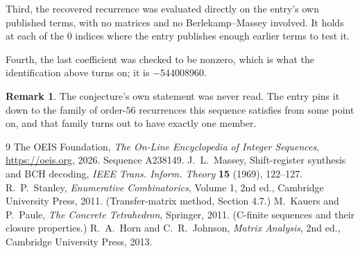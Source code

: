 \documentclass[11pt,a4paper]{article}
\theoremstyle{plain}
\theoremstyle{definition}
\newtheorem{remark}[theorem]{Remark}
\begin{document}
Third, the recovered recurrence was evaluated directly on the entry's own published terms, with
no matrices and no Berlekamp--Massey involved. It holds at each of the $0$ indices where
the entry publishes enough earlier terms to test it.

Fourth, the last coefficient was checked to be nonzero, which is what the identification above
turns on; it is $-544008960$.

\begin{remark}
The conjecture's own statement was never read. The entry pins it down to the family of
order-$56$ recurrences this sequence satisfies from some point on, and that family turns
out to have exactly one member.
\end{remark}

\begin{thebibliography}{9}
 The OEIS Foundation, \emph{The On-Line Encyclopedia of Integer
Sequences}, \url{https://oeis.org}, 2026. Sequence A238149.
 J.~L.~Massey, Shift-register synthesis and BCH decoding, \emph{IEEE
Trans. Inform. Theory} \textbf{15} (1969), 122--127.
 R.~P.~Stanley, \emph{Enumerative Combinatorics}, Volume 1, 2nd ed.,
Cambridge University Press, 2011. (Transfer-matrix method, Section 4.7.)
 M.~Kauers and P.~Paule, \emph{The Concrete Tetrahedron}, Springer, 2011.
(C-finite sequences and their closure properties.)
 R.~A.~Horn and C.~R.~Johnson, \emph{Matrix Analysis}, 2nd ed., Cambridge
University Press, 2013.
\end{thebibliography}
\end{document}
